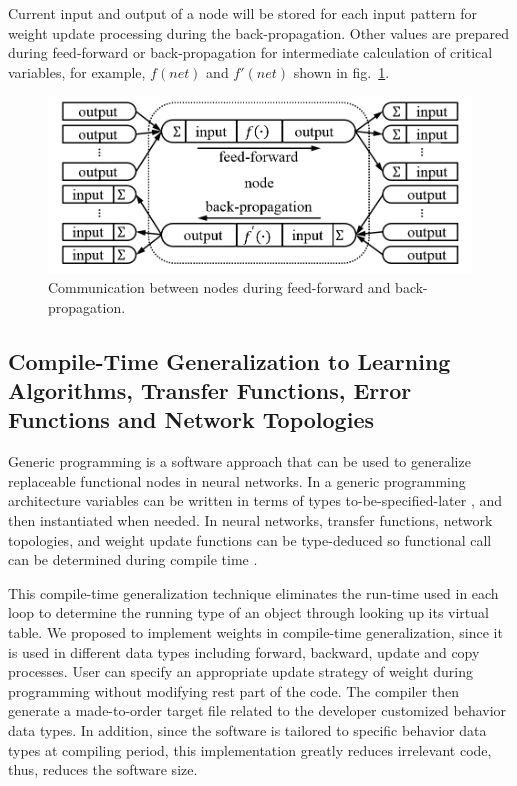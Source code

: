 \documentclass[procedia]{easychair}
\begin{document}
Current input and output of a node will be stored for each input pattern for weight update processing during the back-propagation.  Other values are prepared during feed-forward or back-propagation for intermediate calculation of critical variables, for example, $f(net)$ and $f'(net)$ shown in fig.~\ref{fig:microscopic}.

\begin{figure}[tb]
    \begin{centering}
        \includegraphics[scale=0.5]{../../pic/microscopic.png}
        \caption{Communication between nodes during feed-forward and back-propagation.}
        \label{fig:microscopic}
	\end{centering}
\end{figure}

\subsection{Compile-Time Generalization to Learning Algorithms, Transfer Functions, Error Functions and Network Topologies}

Generic programming is a software approach that can be used to generalize replaceable functional nodes in neural networks.   In a generic programming architecture variables can be written in terms of types to-be-specified-later  \cite{wiki:generic_programming}, and then instantiated when needed.  In neural networks, transfer functions, network topologies, and weight update functions can be type-deduced so functional call can be determined during compile time  \cite{alexandrescu2001preface}.

This compile-time generalization technique eliminates the run-time used in each loop to determine the running type of an object through looking up its virtual table.  We proposed to implement weights in compile-time generalization, since it is used in different data types including forward, backward, update and copy processes.  User can specify an appropriate update strategy of weight during programming without modifying rest part of the code.  The compiler then generate a made-to-order target file related to the developer customized behavior data types.  In addition, since the software is tailored to specific behavior data types at compiling period, this implementation greatly reduces irrelevant code, thus, reduces the software size.
\end{document}
